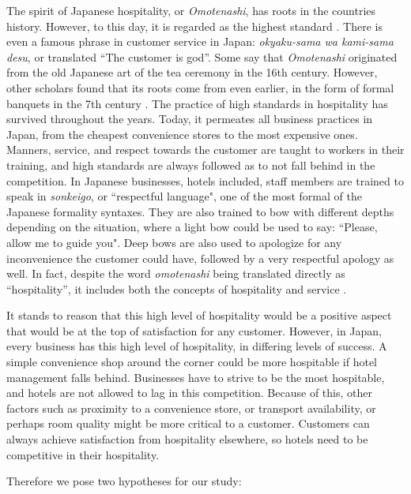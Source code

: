 \documentclass[smallextended,natbib]{svjour3}       %
\begin{document}
The spirit of Japanese hospitality, or \textit{Omotenashi}, has roots in the countries history. However, to this day, it is regarded as the highest standard \cite{ikeda2013omotenashi, al2015characteristics}. There is even a famous phrase in customer service in Japan: \textit{okyaku-sama wa kami-sama desu}, or translated ``The customer is god''. Some say that \textit{Omotenashi} originated from the old Japanese art of the tea ceremony in the 16th century. However, other scholars found that its roots come from even earlier, in the form of formal banquets in the 7th century \cite{aishima2015origin}. The practice of high standards in hospitality has survived throughout the years. Today, it permeates all business practices in Japan, from the cheapest convenience stores to the most expensive ones. Manners, service, and respect towards the customer are taught to workers in their training, and high standards are always followed as to not fall behind in the competition. In Japanese businesses, hotels included, staff members are trained to speak in \textit{sonkeigo}, or ``respectful language", one of the most formal of the Japanese formality syntaxes. They are also trained to bow with different depths depending on the situation, where a light bow could be used to say: ``Please, allow me to guide you". Deep bows are also used to apologize for any inconvenience the customer could have, followed by a very respectful apology as well. In fact, despite the word \textit{omotenashi} being translated directly as ``hospitality'', it includes both the concepts of hospitality and service \cite{Kuboyama2020}. 

It stands to reason that this high level of hospitality would be a positive aspect that would be at the top of satisfaction for any customer. However, in Japan, every business has this high level of hospitality, in differing levels of success. A simple convenience shop around the corner could be more hospitable if hotel management falls behind. Businesses have to strive to be the most hospitable, and hotels are not allowed to lag in this competition. Because of this, other factors such as proximity to a convenience store, or transport availability, or perhaps room quality might be more critical to a customer. Customers can always achieve satisfaction from hospitality elsewhere, so hotels need to be competitive in their hospitality. 

Therefore we pose two hypotheses for our study:
\end{document}
